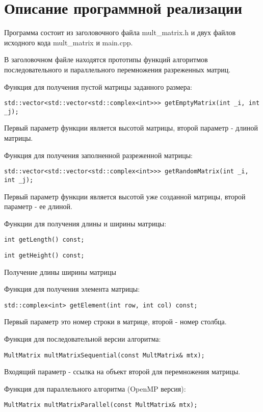 \documentclass{report}
\begin{document}
\section*{Описание программной реализации}
Программа состоит из заголовочного файла mult_matrix.h и двух файлов исходного кода mult_matrix и main.cpp.
\par В заголовочном файле находятся прототипы функций алгоритмов последовательного и параллельного перемножения разреженных матриц.
\par Функция для получения пустой матрицы заданного размера:
\begin{lstlisting}
std::vector<std::vector<std::complex<int>>> getEmptyMatrix(int _i, int _j);
\end{lstlisting}
Первый параметр функции является высотой матрицы, второй параметр - длиной матрицы.
\par Функция для получения заполненной разреженной матрицы:
\begin{lstlisting}
std::vector<std::vector<std::complex<int>>> getRandomMatrix(int _i, int _j);
\end{lstlisting}
Первый параметр функции является высотой уже созданной матрицы, второй параметр - ее длиной.
\par Функции для получения длины и ширины матрицы:
\begin{lstlisting}
int getLength() const;
\end{lstlisting}
\begin{lstlisting}
int getHeight() const;
\end{lstlisting}
Получение длины ширины матрицы
\par Функция для получения элемента матрицы:
\begin{lstlisting}
std::complex<int> getElement(int row, int col) const;
\end{lstlisting}
Первый параметр это номер строки в матрице, второй - номер столбца.
\par Функция для последовательной версии алгоритма:
\begin{lstlisting}
MultMatrix multMatrixSequential(const MultMatrix& mtx);
\end{lstlisting}
Входящий параметр - ссылка на объект второй для перемножения матрицы.
\par Функция для параллельного алгоритма (OpenMP версия):
\begin{lstlisting}
MultMatrix multMatrixParallel(const MultMatrix& mtx);
\end{lstlisting}
\end{document}
